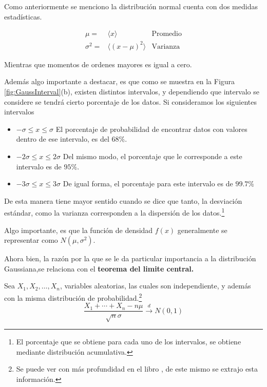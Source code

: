 Como anteriormente se menciono la distribución normal cuenta con dos medidas estadísticas.

\begin{align}
	\mu=& \langle x\rangle & \text{Promedio}\\
	\sigma^2=& \langle (x-\mu)^2\rangle& \text{Varianza}
\end{align}

Mientras que momentos de ordenes mayores es igual a cero.

Además algo importante a destacar, es que como se muestra en la Figura \ref{fig:GaussInterval}(b), existen distintos intervalos, y dependiendo que intervalo se considere se tendrá cierto porcentaje de los datos.
Si consideramos los siguientes intervalos

\begin{itemize}
	\item $-\sigma \leq x \leq \sigma$ 
	El porcentaje de probabilidad de encontrar datos con valores dentro de ese intervalo, es del $68\%$.
	\item $-2\sigma \leq x \leq 2\sigma$
	Del mismo modo, el porcentaje que le corresponde a este intervalo es de $95\%$.
	\item $-3\sigma\leq x\leq 3\sigma$
	De igual forma, el porcentaje para este intervalo es de $99.7\%$
\end{itemize} 


De esta manera tiene mayor sentido cuando se dice que tanto, la desviación estándar, como la varianza corresponden a la dispersión de los datos.\footnote{El porcentaje que se obtiene para cada uno de los intervalos, se obtiene mediante distribución acumulativa.}

Algo importante, es que la función de densidad $f(x)$ generalmente se representar como $N(\mu,\sigma^2)$.

Ahora bien, la razón por la que se le da particular importancia a la distribución Gaussiana,se relaciona con el \textbf{teorema del limite central.}

\begin{tcolorbox}[colback=mycafeF!5!white,colframe=mycafeF,title=\textbf{Teorema del limite central (CLT).}]
Sea $X_1,X_2,\dots,X_n$, variables aleatorias, las cuales son independiente, y además con la misma distribución de probabilidad.\footnote{Se puede ver con más profundidad en el libro \cite{RincónInterm}, de este mismo se extrajo esta información.}
\begin{equation}
	\frac{X_1+\cdots + X_n - n\mu}{\sqrt{n}\sigma}\overset{d}{\to} N(0,1)
    \label{eq:CLT}
\end{equation}

    
\end{tcolorbox}

